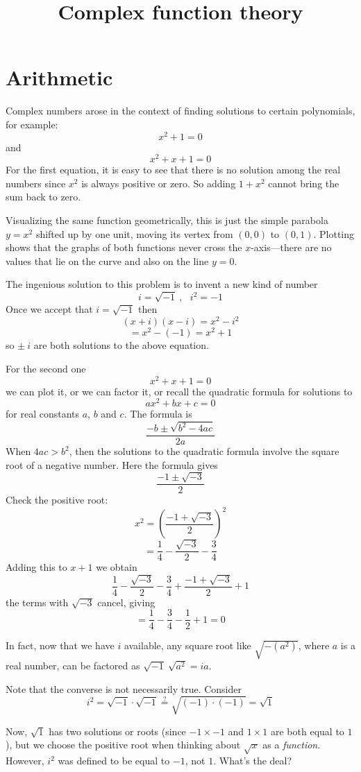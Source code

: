 \documentclass[11pt, oneside]{article}   	%
\title{Complex function theory}
\date{}							%
\begin{document}
\maketitle
\Large

\section{Arithmetic}
Complex numbers arose in the context of finding solutions to certain polynomials, for example:
\[ x^2 + 1 = 0 \]
and
\[ x^2 + x + 1 = 0 \]
For the first equation, it is easy to see that there is no solution among the real numbers since $x^2$ is always positive or zero.  So adding $1 + x^2$ cannot bring the sum back to zero.

Visualizing the same function geometrically, this is just the simple parabola $y=x^2$ shifted up by one unit, moving its vertex from $(0,0)$ to $(0,1)$.  Plotting shows that the graphs of both functions never cross the $x$-axis---there are no values that lie on the curve and also on the line $y=0$.

The ingenious solution to this problem is to invent a new kind of number
\[ i = \sqrt{-1} \ , \ \ \ i^2 = -1 \]
Once we accept that $i = \sqrt{-1}$
then
\[ (x + i)(x - i) = x^2 - i^2 \]
\[ = x^2 - (-1) = x^2 + 1 \]
so $\pm \ i$ are both solutions to the above equation.

For the second one
\[ x^2 + x + 1 = 0 \]
we can plot it, or we can factor it, or recall the quadratic formula for solutions to
\[ ax^2 + bx + c = 0 \]
for real constants $a$, $b$ and $c$.  The formula is
\[ \frac{-b \pm \sqrt{b^2 - 4ac}}{2a} \]
When $4ac > b^2$, then the solutions to the quadratic formula involve the square root of a negative number.  Here the formula gives
\[ \frac{-1 \pm \sqrt{-3}}{2} \]
Check the positive root:
\[ x^2 = (\frac{-1 + \sqrt{-3}}{2})^2 \]
\[ = \frac{1}{4} - \frac{\sqrt{-3}}{2} - \frac{3}{4} \]
Adding this to $x+1$ we obtain
\[  \frac{1}{4} - \frac{\sqrt{-3}}{2} - \frac{3}{4}  + \frac{-1 + \sqrt{-3}}{2} + 1 \]
the terms with $\sqrt{-3}$ cancel, giving
\[ = \frac{1}{4} - \frac{3}{4}  - \frac{1}{2} + 1 = 0 \]

In fact, now that we have $i$ available, any square root like $\sqrt{-(a^2)}$, where $a$ is a real number, can be factored as $\sqrt{-1} \ \sqrt{a^2} = ia$.

Note that the converse is not necessarily true.  Consider
\[ i^2 = \sqrt{-1} \cdot \sqrt{-1} \stackrel{?}{=} \sqrt{(-1)\cdot (-1)} = \sqrt{1} \]

Now, $\sqrt{1}$ has two solutions or roots (since $-1 \times -1$ and $1 \times 1$ are both equal to $1$), but we choose the positive root when thinking about $\sqrt{x}$ as a \emph{function}.  However, $i^2$ was defined to be equal to $-1$, not $1$.  What's the deal?
\end{document}
